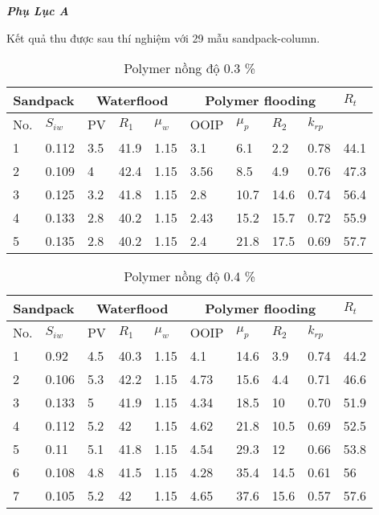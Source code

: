\documentclass[12pt,a4paper]{article}
\begin{document}
	\newpage
	\noindent
\Large{\textit{\textbf{Phụ Lục A}}}\\
Kết quả thu được sau thí nghiệm với 29 mẫu sandpack-column.
\begin{table}[h]
\centering
\caption{Polymer nồng độ 0.3 \%}
\label{my-label}
\begin{tabularx}{\textwidth}{@{}XX|XXX|XXXX|X@{}}
\toprule
\multicolumn{2}{c}{Sandpack} & \multicolumn{3}{c}{Waterflood} & \multicolumn{4}{c}{Polymer flooding} & $R_t$ \\ \midrule
No.        & $S_{iw}$        & PV      & $R_1$    & $\mu_w$   & OOIP   & $\mu_p$  & $R_2$ & $k_{rp}$ &       \\
1          & 0.112           & 3.5     & 41.9     & 1.15      & 3.1    & 6.1      & 2.2   & 0.78     & 44.1  \\
2          & 0.109           & 4       & 42.4     & 1.15      & 3.56   & 8.5      & 4.9   & 0.76     & 47.3  \\
3          & 0.125           & 3.2     & 41.8     & 1.15      & 2.8    & 10.7     & 14.6  & 0.74     & 56.4  \\
4          & 0.133           & 2.8     & 40.2     & 1.15      & 2.43   & 15.2     & 15.7  & 0.72     & 55.9  \\
5          & 0.135           & 2.8     & 40.2     & 1.15      & 2.4    & 21.8     & 17.5  & 0.69     & 57.7  \\ \bottomrule
\end{tabularx}
\end{table}
\begin{table}[h]
\centering
\caption{Polymer nồng độ 0.4 \%}
\label{my-label}
\begin{tabularx}{\textwidth}{@{}XX|XXX|XXXX|X@{}}
\toprule
\multicolumn{2}{c}{Sandpack} & \multicolumn{3}{c}{Waterflood} & \multicolumn{4}{c}{Polymer flooding} & $R_t$ \\ \midrule
No.        & $S_{iw}$        & PV      & $R_1$    & $\mu_w$   & OOIP   & $\mu_p$  & $R_2$ & $k_{rp}$ &       \\
1          & 0.92            & 4.5     & 40.3     & 1.15      & 4.1    & 14.6     & 3.9   & 0.74     & 44.2  \\
2          & 0.106           & 5.3     & 42.2     & 1.15      & 4.73   & 15.6     & 4.4   & 0.71     & 46.6  \\
3          & 0.133           & 5       & 41.9     & 1.15      & 4.34   & 18.5     & 10    & 0.70     & 51.9  \\
4          & 0.112           & 5.2     & 42       & 1.15      & 4.62   & 21.8     & 10.5  & 0.69     & 52.5  \\
5          & 0.11            & 5.1     & 41.8     & 1.15      & 4.54   & 29.3     & 12    & 0.66     & 53.8  \\
6          & 0.108           & 4.8     & 41.5     & 1.15      & 4.28   & 35.4     & 14.5  & 0.61     & 56    \\
7          & 0.105           & 5.2     & 42       & 1.15      & 4.65   & 37.6     & 15.6  & 0.57     & 57.6  \\ \bottomrule
\end{tabularx}
\end{table}
\end{document}
